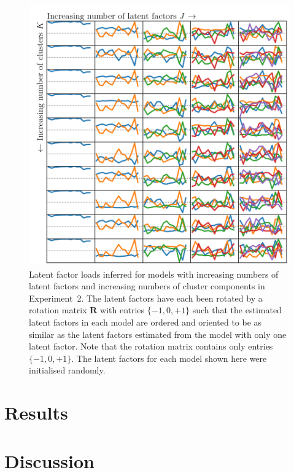 \documentclass[twocolumn]{aastex61}
\begin{document}
\begin{figure}
	\includegraphics[width=1.0\textwidth]{experiments/galah-experiment-2-gridsearch-factors-wrt-J-and-K.png}
	\caption{Latent factor loads inferred for models with increasing numbers
			 of latent factors and increasing numbers of cluster components
			 in Experiment~2. The latent factors have each been rotated by a
			 rotation matrix $\textbf{R}$ with entries $\{-1, 0, +1\}$ such 
			 that the estimated latent factors in each model are ordered 
			 and oriented to be as similar as the latent factors estimated from
			 the model with only one latent factor. Note that the rotation
			 matrix contains only entries $\{-1, 0, +1\}$. The latent
			 factors for each model shown here were initialised randomly.
			 }
	\label{fig:experiment-2-gridsearch-factors-init-svd}
\end{figure}






\section{Results} \label{sec:results}

\section{Discussion} \label{sec:discussion}
\end{document}
